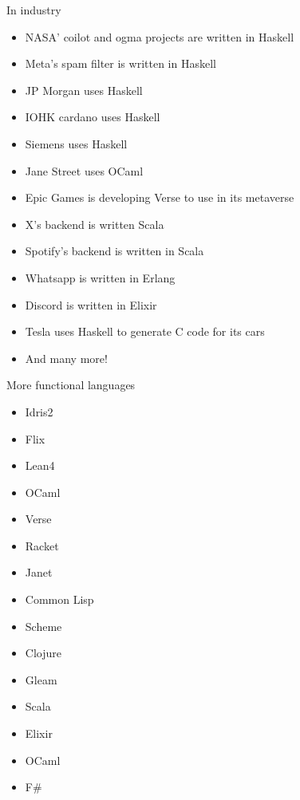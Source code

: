 \documentclass[pdf]{beamer}
\begin{document}
\begin{frame}{In industry}
  \begin{itemize}
  \item NASA' coilot and ogma projects are written in Haskell
  \item Meta's spam filter is written in Haskell
  \item JP Morgan uses Haskell
  \item IOHK cardano uses Haskell
  \item Siemens uses Haskell
  \item Jane Street uses OCaml
  \item Epic Games is developing Verse to use in its metaverse
  \item X's backend is written Scala
  \item Spotify's backend is written in Scala
  \item Whatsapp is written in Erlang
  \item Discord is written in Elixir
  \item Tesla uses Haskell to generate C code for its cars
  \item And many more!
  \end{itemize}
\end{frame}

\begin{frame}{More functional languages}
  \begin{itemize}
  \item Idris2
  \item Flix
  \item Lean4
  \item OCaml
  \item Verse
  \item Racket
  \item Janet
  \item Common Lisp
  \item Scheme
  \item Clojure
  \item Gleam
  \item Scala
  \item Elixir
  \item OCaml
  \item F\#
  \end{itemize}
\end{frame}
\end{document}
